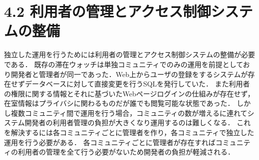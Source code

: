 

\section*{4.2 利用者の管理とアクセス制御システムの整備}






独立した運用を行うためには利用者の管理とアクセス制御システムの整備が必要である．
既存の滞在ウォッチは単独コミュニティでのみの運用を前提としており開発者と管理者が同一であった．Web上からユーザの登録をするシステムが存在せずデータベースに対して直接変更を行うSQLを発行していた．
また利用者の権限に関する情報とそれに基づいたWebページログインの仕組みが存在せず，在室情報はプライバシに関わるものだが誰でも閲覧可能な状態であった．
しかし複数コミュニティ間で運用を行う場合，コミュニティの数が増えるに連れてシステム開発者の利用者管理の負担が大きくなり運用するのは難しくなる．
これを解決するには各コミュニティごとに管理者を作り，各コミュニティで独立した運用を行う必要がある．
各コミュニティごとに管理者が存在すればコミュニティの利用者の管理を全て行う必要がないため開発者の負担が軽減される．

